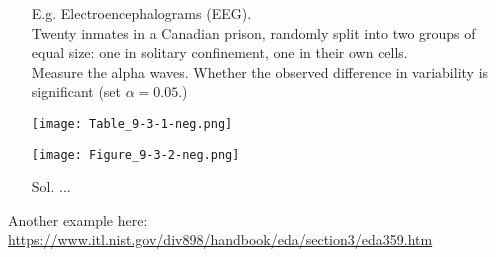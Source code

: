 \begin{frame}
\begin{itemize}
	\item[E.g.] Electroencephalograms (EEG). \\[1em]
		Twenty inmates in a Canadian prison, randomly split into
		two groups of equal size: one in solitary confinement, one in their own cells.\\[1em]
		Measure the alpha waves.
		Whether the observed difference in variability is significant (set $\alpha=0.05$.)\\
		\vfill
		\begin{minipage}{0.45\textwidth}
			\texttt{[image: Table\_9-3-1-neg.png]}
\end{minipage}
		\begin{minipage}{0.45\textwidth}
			\texttt{[image: Figure\_9-3-2-neg.png]}
\end{minipage}
\vfill
\item[Sol.] ... \myEnd
\end{itemize}
\end{frame}
\begin{frame}
Another example here: \\[2em]
\url{https://www.itl.nist.gov/div898/handbook/eda/section3/eda359.htm}
\end{frame}
